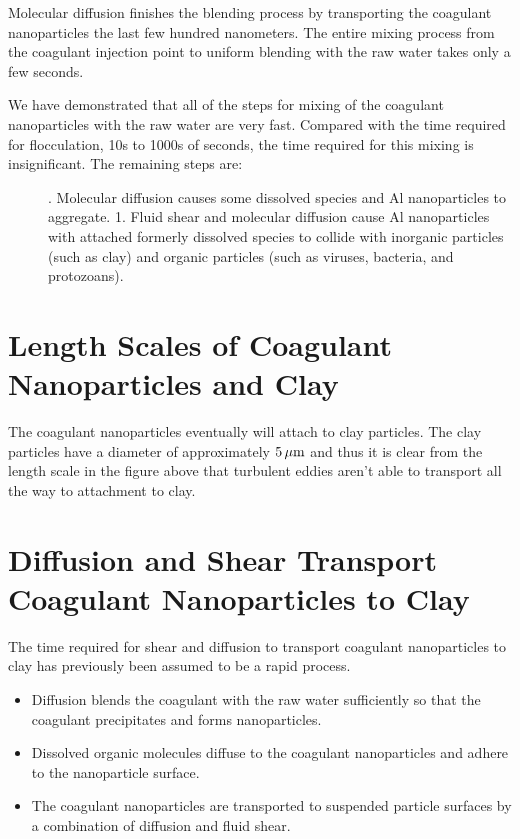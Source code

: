 \documentclass[letterpaper,10pt,english]{sphinxmanual}
\begin{document}
Molecular diffusion finishes the blending process by transporting the coagulant nanoparticles the last few hundred nanometers. The entire mixing process from the coagulant injection point to uniform blending with the raw water takes only a few seconds.
\begin{description}
\item[{We have demonstrated that all of the steps for mixing of the coagulant nanoparticles with the raw water are very fast. Compared with the time required for flocculation, 10s to 1000s of seconds, the time required for this mixing is insignificant. The remaining steps are:}] . Molecular diffusion causes some dissolved species and Al nanoparticles to aggregate.
1. Fluid shear and molecular diffusion cause Al nanoparticles with attached formerly dissolved species to collide with inorganic particles (such as clay) and organic particles (such as viruses, bacteria, and protozoans).

\end{description}


\section{Length Scales of Coagulant Nanoparticles and Clay}
\label{\detokenize{Rapid_Mix/RM_Theory_and_Future_Work:length-scales-of-coagulant-nanoparticles-and-clay}}\label{\detokenize{Rapid_Mix/RM_Theory_and_Future_Work:heading-length-scales-of-coagulant-nanoparticles-and-clay}}
The coagulant nanoparticles eventually will attach to clay particles. The clay particles have a diameter of approximately \(5 \, {\rm \mu m}\) and thus it is clear from the length scale in the figure above that turbulent eddies aren’t able to transport all the way to attachment to clay.


\section{Diffusion and Shear Transport Coagulant Nanoparticles to Clay}
\label{\detokenize{Rapid_Mix/RM_Theory_and_Future_Work:diffusion-and-shear-transport-coagulant-nanoparticles-to-clay}}\label{\detokenize{Rapid_Mix/RM_Theory_and_Future_Work:heading-diffusion-and-shear-transport-coagulant-nanoparticles-to-clay}}
The time required for shear and diffusion to transport coagulant nanoparticles to clay has previously been assumed to be a rapid process.
\begin{itemize}
\item {} 
Diffusion blends the coagulant with the raw water sufficiently so that the coagulant precipitates and forms nanoparticles.

\item {} 
Dissolved organic molecules diffuse to the coagulant nanoparticles and adhere to the nanoparticle surface.

\item {} 
The coagulant nanoparticles are transported to suspended particle surfaces by a combination of diffusion and fluid shear.

\end{itemize}
\end{document}

